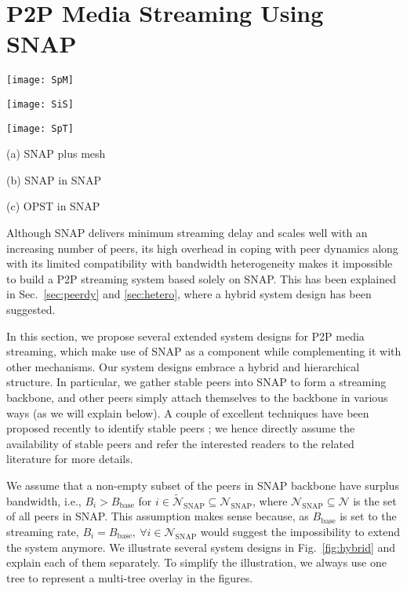 \documentclass[conference]{IEEEtran}
\begin{document}
\section{P2P Media Streaming Using SNAP} \label{sec:hybpp}
\begin{figure*}[ht]
   \begin{center}
       \parbox{\textwidth}{\parbox{.33\textwidth}{\center\texttt{[image: SpM]}}
                           \parbox{.33\textwidth}{\center\texttt{[image: SiS]}}
                           \parbox{.33\textwidth}{\center\texttt{[image: SpT]}}}
\parbox{\textwidth}{\parbox{.33\textwidth}{\center\scriptsize(a) SNAP plus mesh}
                           \parbox{.33\textwidth}{\center\scriptsize(b) SNAP in SNAP}
                           \parbox{.33\textwidth}{\center\footnotesize(c) OPST in SNAP}}
       \vspace{-2ex}
    \caption{Various ways of applying SNAP in P2P media streaming.}\vspace{-2ex}\label{fig:hybrid}
   \end{center}
  \end{figure*}
Although SNAP delivers minimum streaming delay and scales well with an increasing number of peers, its high overhead in coping with peer dynamics along with its limited compatibility with bandwidth heterogeneity makes it impossible to build a P2P streaming system based solely on SNAP. This has been explained in Sec.~\ref{sec:peerdy} and \ref{sec:hetero}, where a hybrid system design has been suggested.

  In this section, we propose several extended system designs for P2P media streaming, which make use of SNAP as a component while complementing it with other mechanisms. Our system designs embrace a hybrid and hierarchical structure. In particular, we gather stable peers into SNAP to form a streaming backbone, and other peers simply attach themselves to the backbone in various ways (as we will explain below). A couple of excellent techniques have been proposed recently to identify stable peers \cite{WangLX-INFOCOM08,LiuWLZ-INFOCOM09}; we hence directly assume the availability of stable peers and refer the interested readers to the related literature for more details.

  We assume that a non-empty subset of the peers in SNAP backbone have surplus bandwidth, i.e., $B_i > B_\mathrm{base}$ for $i \in \widetilde{\mathcal{N}}_\mathrm{SNAP} \subseteq \mathcal{N}_\mathrm{SNAP}$, where $\mathcal{N}_\mathrm{SNAP} \subseteq \mathcal{N}$ is the set of all peers in SNAP. This assumption makes sense because, as $B_\mathrm{base}$ is set to the streaming rate, $B_i = B_\mathrm{base},~\forall i \in \mathcal{N}_\mathrm{SNAP}$ would suggest the impossibility to extend the system anymore. We illustrate several system designs in Fig.~\ref{fig:hybrid} and explain each of them separately. To simplify the illustration, we always use one tree to represent a multi-tree overlay in the figures.
  
\end{document}
